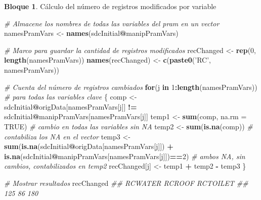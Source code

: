 \documentclass[]{book}
\newenvironment{Shaded}{\begin{snugshade}}{\end{snugshade}}
\newcommand{\CommentTok}[1]{\textcolor[rgb]{0.56,0.35,0.01}{\textit{#1}}}
\newcommand{\ControlFlowTok}[1]{\textcolor[rgb]{0.13,0.29,0.53}{\textbf{#1}}}
\newcommand{\DataTypeTok}[1]{\textcolor[rgb]{0.13,0.29,0.53}{#1}}
\newcommand{\DecValTok}[1]{\textcolor[rgb]{0.00,0.00,0.81}{#1}}
\newcommand{\KeywordTok}[1]{\textcolor[rgb]{0.13,0.29,0.53}{\textbf{#1}}}
\newcommand{\NormalTok}[1]{#1}
\newcommand{\OperatorTok}[1]{\textcolor[rgb]{0.81,0.36,0.00}{\textbf{#1}}}
\newcommand{\OtherTok}[1]{\textcolor[rgb]{0.56,0.35,0.01}{#1}}
\newcommand{\StringTok}[1]{\textcolor[rgb]{0.31,0.60,0.02}{#1}}
\theoremstyle{definition}
\theoremstyle{definition}
\newtheorem{example}{Bloque}[chapter]
\theoremstyle{definition}
\theoremstyle{definition}
\theoremstyle{remark}
\begin{document}
\begin{example}
\protect\hypertarget{exm:bloque3lbn}{}{\label{exm:bloque3lbn} }Cálculo del número de registros modificados por variable
\end{example}

\begin{Shaded}
\begin{Highlighting}[]
\CommentTok{# Almacene los nombres de todas las variables del pram en un vector}
\NormalTok{namesPramVars <-}\StringTok{ }\KeywordTok{names}\NormalTok{(sdcInitial}\OperatorTok{@}\NormalTok{manipPramVars)}

\CommentTok{# Marco para guardar la cantidad de registros modificados}
\NormalTok{recChanged <-}\StringTok{ }\KeywordTok{rep}\NormalTok{(}\DecValTok{0}\NormalTok{, }\KeywordTok{length}\NormalTok{(namesPramVars))}
\KeywordTok{names}\NormalTok{(recChanged) <-}\StringTok{ }\KeywordTok{c}\NormalTok{(}\KeywordTok{paste0}\NormalTok{(}\StringTok{'RC'}\NormalTok{, namesPramVars))}

\CommentTok{# Cuenta del número de registros cambiados}
\ControlFlowTok{for}\NormalTok{(j }\ControlFlowTok{in} \DecValTok{1}\OperatorTok{:}\KeywordTok{length}\NormalTok{(namesPramVars)) }\CommentTok{# para todas las  variables clave}
\NormalTok{\{}
\NormalTok{  comp <-}\StringTok{ }\NormalTok{sdcInitial}\OperatorTok{@}\NormalTok{origData[namesPramVars[j]] }\OperatorTok{!=}
\StringTok{                              }\NormalTok{sdcInitial}\OperatorTok{@}\NormalTok{manipPramVars[namesPramVars[j]]}
\NormalTok{  temp1 <-}\StringTok{ }\KeywordTok{sum}\NormalTok{(comp, }\DataTypeTok{na.rm =} \OtherTok{TRUE}\NormalTok{) }\CommentTok{# cambio en todas las variables sin NA}
\NormalTok{  temp2 <-}\StringTok{ }\KeywordTok{sum}\NormalTok{(}\KeywordTok{is.na}\NormalTok{(comp))        }\CommentTok{# contabiliza los NA en el vector}
\NormalTok{  temp3 <-}\StringTok{ }\KeywordTok{sum}\NormalTok{(}\KeywordTok{is.na}\NormalTok{(sdcInitial}\OperatorTok{@}\NormalTok{origData[namesPramVars[j]])}
               \OperatorTok{+}\StringTok{ }\KeywordTok{is.na}\NormalTok{(sdcInitial}\OperatorTok{@}\NormalTok{manipPramVars[namesPramVars[j]])}\OperatorTok{==}\DecValTok{2}\NormalTok{)}
  \CommentTok{# ambos NA, sin cambios, contabilizados en temp2}
\NormalTok{  recChanged[j] <-}\StringTok{ }\NormalTok{temp1 }\OperatorTok{+}\StringTok{ }\NormalTok{temp2 }\OperatorTok{-}\StringTok{ }\NormalTok{temp3}
\NormalTok{\}}

\CommentTok{# Mostrar resultados}
\NormalTok{recChanged}
\CommentTok{##  RCWATER   RCROOF RCTOILET}
\CommentTok{##      125       86      180}
\end{Highlighting}
\end{Shaded}
\end{document}
